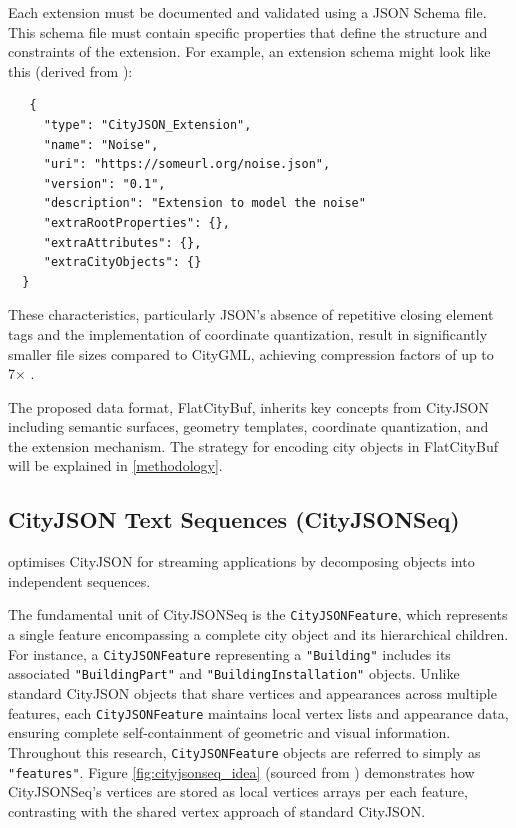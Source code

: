 Each extension must be documented and validated using a JSON Schema file. This schema file must contain specific properties that define the structure and constraints of the extension. For example, an extension schema might look like this (derived from \citet{ledoux_2019}):

\begin{lstlisting}
   {
     "type": "CityJSON_Extension",
     "name": "Noise",
     "uri": "https://someurl.org/noise.json",
     "version": "0.1",
     "description": "Extension to model the noise"
     "extraRootProperties": {},
     "extraAttributes": {},
     "extraCityObjects": {}
  }
\end{lstlisting}

These characteristics, particularly JSON's absence of repetitive closing element tags and the implementation of coordinate quantization, result in significantly smaller file sizes compared to CityGML, achieving compression factors of up to 7× \citep{ledoux_2019}.

The proposed data format, FlatCityBuf, inherits key concepts from CityJSON including semantic surfaces, geometry templates, coordinate quantization, and the extension mechanism. The strategy for encoding city objects in FlatCityBuf will be explained in \autoref{methodology}.

\subsection{CityJSON Text Sequences (CityJSONSeq)}
\label{rw:cityjson_enhancements:cityjsonseq}

\citet{ledoux_2024} optimises CityJSON for streaming applications by decomposing objects into independent sequences.

The fundamental unit of CityJSONSeq is the \texttt{CityJSONFeature}, which represents a single feature encompassing a complete city object and its hierarchical children. For instance, a \texttt{CityJSONFeature} representing a \texttt{"Building"} includes its associated \texttt{"BuildingPart"} and \texttt{"BuildingInstallation"} objects. Unlike standard CityJSON objects that share vertices and appearances across multiple features, each \texttt{CityJSONFeature} maintains local vertex lists and appearance data, ensuring complete self-containment of geometric and visual information. Throughout this research, \texttt{CityJSONFeature} objects are referred to simply as \texttt{"features"}. Figure \autoref{fig:cityjsonseq_idea} (sourced from \citet{ledoux_2024}) demonstrates how CityJSONSeq's vertices are stored as local vertices arrays per each feature, contrasting with the shared vertex approach of standard CityJSON.

